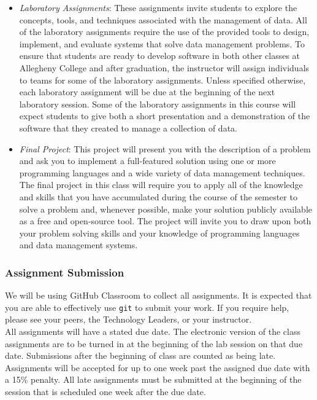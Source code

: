 \documentclass[11pt]{article} %
\begin{document}
\begin{itemize}
  \item {\em Laboratory Assignments}: These assignments invite students to explore the concepts, tools, and techniques associated with the management of data.  All of the laboratory assignments require the use of the provided tools to design, implement, and evaluate systems that solve data management problems.  To ensure that students are ready to develop software in both other classes at Allegheny College and after graduation, the instructor will assign individuals to teams for some of the laboratory assignments.  Unless specified otherwise, each laboratory assignment will be due at the beginning of the next laboratory session.  Some of the laboratory assignments in this course will expect students to give both a short presentation and a demonstration of the software that they created to manage a collection of data.  


  \item {\em Final Project}: This project will present you with the description of a problem and ask you to implement a full-featured solution using one or more programming languages and a wide variety of data management techniques. The final project in this class will require you to apply all of the knowledge and skills that you have accumulated during the course of the semester to solve a problem and, whenever possible, make your solution publicly available as a free and open-source tool. The project will invite you to draw upon both your problem solving skills and your knowledge of programming languages and data management systems. 


\end{itemize}






\subsubsection*{Assignment Submission}

We will be using GitHub Classroom to collect all assignments. It is expected that you are able to effectively use {\tt git} to submit your work. If you require help, please see your peers, the Technology Leaders, or your instructor.\\

All assignments will have a stated due date. \color{red} The electronic version of the class assignments are to be turned in at the beginning of the lab session on that due date. Submissions after the beginning of class are counted as being late.  Assignments will be accepted for up to one week past the assigned due date with a 15\% penalty. \color{black} All late assignments must be submitted at the beginning of the session that is scheduled one week after the due date. 
\end{document}
